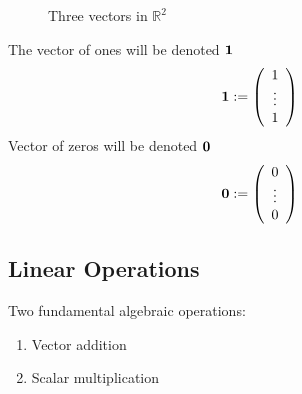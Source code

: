 \documentclass[letterpaper,10pt,english]{jupyterBook}
\begin{document}
\begin{figure}[htbp]
\centering
\capstart

\noindent{}
\caption{Three vectors in \(\mathbb{R}^2\)}\label{\detokenize{05.linear_algebra:id2}}\end{figure}

\sphinxAtStartPar
The vector of ones will be denoted \({\bf 1}\)
\begin{equation*}
\begin{split}
%
{\bf 1} := 
\left(
\begin{array}{c}
1 \\
\vdots \\
1
\end{array}
\right)
%
\end{split}
\end{equation*}
\sphinxAtStartPar
Vector of zeros will be denoted \({\bf 0}\)
\begin{equation*}
\begin{split}
%
{\bf 0} := 
\left(
\begin{array}{c}
0 \\
\vdots \\
0
\end{array}
\right)
%
\end{split}
\end{equation*}

\subsection{Linear Operations}
\label{\detokenize{05.linear_algebra:linear-operations}}
\sphinxAtStartPar
Two fundamental algebraic operations:
\begin{enumerate}
%
\item {} 
\sphinxAtStartPar
Vector addition

\item {} 
\sphinxAtStartPar
Scalar multiplication

\end{enumerate}
\end{document}
